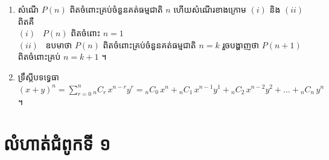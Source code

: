 \begin{note}[មេរៀនសង្ខេប]
\begin{enumerate}[1]
  \item សំណើ $P(n)$ ពិតចំពោះគ្រប់ចំនួនគត់ធម្មជាតិ $n$ ហើយសំណើរខាងក្រោម $(i)$ និង $(ii)$ ពិតគឺ \\
  $(i)$ \ $P(n)$ ពិតចំពោះ $n = 1$ \\
  $(ii)$ \ ឧបមាថា $P(n)$ ពិតចំពោះគ្រប់ចំនួនគត់ធម្មជាតិ $n = k$ រួចបង្ហាញថា $P(n+1)$ ពិតចំពោះគ្រប់ $n = k + 1$ ។
  \item ទ្រឹស្តីបទទ្វេធា $(x + y)^n = \displaystyle\sum_{r=0}^{n} {}_nC_r\,x^{n-r}y^r = {}_nC_0\,x^n + {}_nC_1\,x^{n-1}y^1 + {}_nC_2\,x^{n-2}y^2 + \ldots + {}_nC_n\,y^n$ ។
\end{enumerate}
\end{note}

\section*{លំហាត់ជំពូកទី ១}
